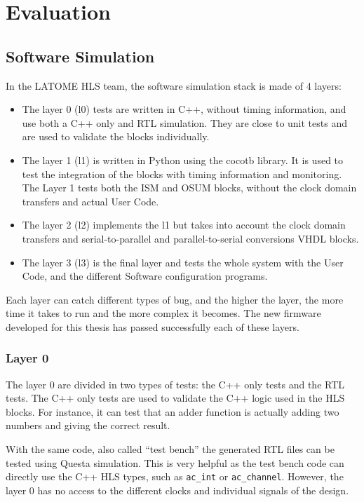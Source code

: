 \chapter{Evaluation}\label{sec:evaluation}

\section{Software Simulation}

In the LATOME HLS team, the software simulation stack is made of 4 layers:
\begin{itemize}
    \item The layer 0 (l0) tests are written in C++, without timing information, and use both a C++ only and RTL simulation. They are close to unit tests and are used to validate the blocks individually.
    \item The layer 1 (l1) is written in Python using the cocotb library. It is used to test the integration of the blocks with timing information and monitoring. The Layer 1 tests both the ISM and OSUM blocks, without the clock domain transfers and actual User Code.
    \item The layer 2 (l2) implements the l1 but takes into account the clock domain transfers and serial-to-parallel and parallel-to-serial conversions VHDL blocks.
    \item The layer 3 (l3) is the final layer and tests the whole system with the User Code, and the different Software configuration programs.
\end{itemize}

Each layer can catch different types of bug, and the higher the layer, the more time it takes to run and the more complex it becomes. The new firmware developed for this thesis has passed successfully each of these layers.

\subsection{Layer 0}

The layer 0 are divided in two types of tests: the C++ only tests and the RTL tests. The C++ only tests are used to validate the C++ logic used in the HLS blocks. For instance, it can test that an adder function is actually adding two numbers and giving the correct result.

With the same code, also called ``test bench'' the generated RTL files can be tested using Questa simulation. This is very helpful as the test bench code can directly use the C++ HLS types, such as \verb|ac_int| or \verb|ac_channel|. However, the layer 0 has no access to the different clocks and individual signals of the design. 

